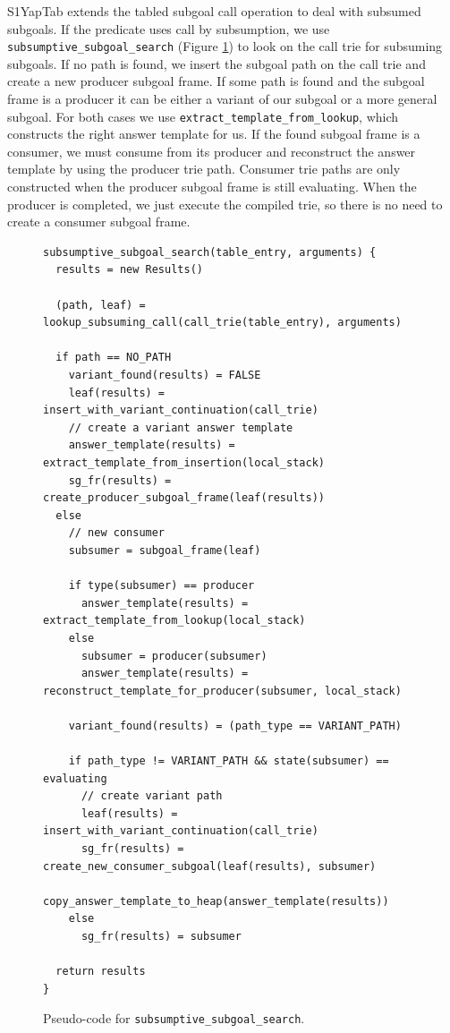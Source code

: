 S1YapTab extends the tabled subgoal call operation to deal with subsumed subgoals.
If the predicate uses call by subsumption, we use \texttt{subsumptive\_subgoal\_search}
(Figure \ref{fig:subsumptive_subgoal_search}) to look on the call trie for subsuming subgoals.
If no path is found, we insert the subgoal path on the call trie and create a new producer
subgoal frame. If some path is found and the subgoal frame is a producer it can be either
a variant of our subgoal or a more general subgoal. For both cases
we use \texttt{extract\_template\_from\_lookup}, which constructs the right answer template for us.
If the found subgoal frame is a consumer, we must consume from its producer and reconstruct the answer
template by using the producer trie path.
Consumer trie paths are only constructed when the producer subgoal frame is still evaluating.
When the producer is completed, we just execute the compiled trie, so there is no need
to create a consumer subgoal frame.

\begin{figure}[ht]
\begin{Verbatim}
subsumptive_subgoal_search(table_entry, arguments) {
  results = new Results()
  
  (path, leaf) = lookup_subsuming_call(call_trie(table_entry), arguments)
  
  if path == NO_PATH
    variant_found(results) = FALSE
    leaf(results) = insert_with_variant_continuation(call_trie)
    // create a variant answer template
    answer_template(results) = extract_template_from_insertion(local_stack)
    sg_fr(results) = create_producer_subgoal_frame(leaf(results))
  else
    // new consumer
    subsumer = subgoal_frame(leaf)
    
    if type(subsumer) == producer
      answer_template(results) = extract_template_from_lookup(local_stack)
    else
      subsumer = producer(subsumer)
      answer_template(results) = reconstruct_template_for_producer(subsumer, local_stack)
    
    variant_found(results) = (path_type == VARIANT_PATH)
    
    if path_type != VARIANT_PATH && state(subsumer) == evaluating
      // create variant path
      leaf(results) = insert_with_variant_continuation(call_trie)
      sg_fr(results) = create_new_consumer_subgoal(leaf(results), subsumer)
      copy_answer_template_to_heap(answer_template(results))
    else
      sg_fr(results) = subsumer
  
  return results
}
\end{Verbatim}
\caption{Pseudo-code for \texttt{subsumptive\_subgoal\_search}.}
\label{fig:subsumptive_subgoal_search}
\end{figure}

